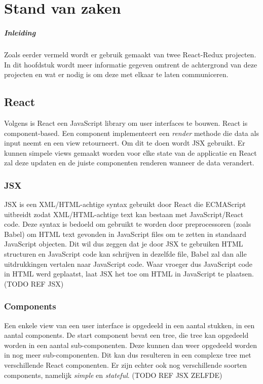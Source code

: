 \chapter{Stand van zaken}
\label{ch:stand-van-zaken}


\paragraph{Inleiding}
Zoals eerder vermeld wordt er gebruik gemaakt van twee React-Redux projecten. In dit hoofdstuk wordt meer informatie gegeven omtrent de achtergrond van deze projecten en wat er nodig is om deze met elkaar te laten communiceren.

\section{React}
Volgens \autocite{React01} is React een JavaScript library om user interfaces te bouwen. React is component-based. Een component implementeert een \textit{render} methode die data als input neemt en een view retourneert. Om dit te doen wordt JSX gebruikt. Er kunnen simpele views gemaakt worden voor elke state van de applicatie en React zal deze updaten en de juiste componenten renderen wanneer de data verandert.

\subsection{JSX}
JSX is een XML/HTML-achtige syntax gebruikt door React die ECMAScript uitbreidt zodat XML/HTML-achtige text kan bestaan met JavaScript/React code. Deze syntax is bedoeld om gebruikt te worden door preprocessoren (zoals Babel) om HTML text gevonden in JavaScript files om te zetten in standaard JavaScript objecten. Dit wil dus zeggen dat je door JSX te gebruiken HTML structuren en JavaScript code kan schrijven in dezelfde file, Babel zal dan alle uitdrukkingen vertalen naar JavaScript code. Waar vroeger dus JavaScript code in HTML werd geplaatst, laat JSX het toe om HTML in JavaScript te plaatsen.
(TODO REF JSX)

\subsection{Components}
Een enkele view van een user interface is opgedeeld in een aantal stukken, in een aantal components. De start component bevat een tree, die tree kan opgedeeld worden in een aantal sub-componenten. Deze kunnen dan weer opgedeeld worden in nog meer sub-componenten. Dit kan dus resulteren in een complexe tree met verschillende React componenten. Er zijn echter ook nog verschillende soorten components, namelijk \textit{simple} en \textit{stateful}. 
(TODO REF JSX ZELFDE)


